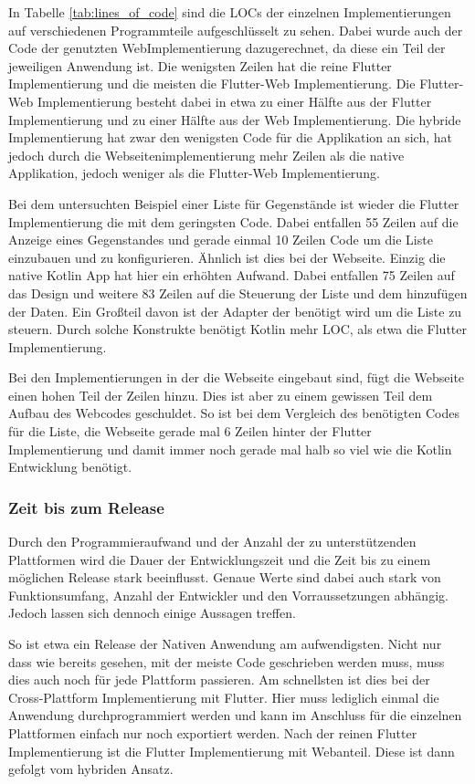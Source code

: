 In Tabelle \ref{tab:lines_of_code} sind die \ac{LOC}s der einzelnen Implementierungen auf verschiedenen Programmteile aufgeschlüsselt zu sehen. Dabei wurde auch der Code der genutzten WebImplementierung dazugerechnet, da diese ein Teil der jeweiligen Anwendung ist. Die wenigsten Zeilen hat die reine Flutter Implementierung und die meisten die Flutter-Web Implementierung.  Die Flutter-Web Implementierung besteht dabei in etwa zu einer Hälfte aus der Flutter Implementierung und zu einer Hälfte aus der Web Implementierung. Die hybride Implementierung hat zwar den wenigsten Code für die Applikation an sich, hat jedoch durch die Webseitenimplementierung mehr Zeilen als die native Applikation, jedoch weniger als die Flutter-Web Implementierung. 

Bei dem untersuchten Beispiel einer Liste für Gegenstände ist wieder die Flutter Implementierung die mit dem geringsten Code. Dabei entfallen 55 Zeilen auf die Anzeige eines Gegenstandes und gerade einmal 10 Zeilen Code um die Liste einzubauen und zu konfigurieren. Ähnlich ist dies bei der Webseite. Einzig die native Kotlin App hat hier ein erhöhten Aufwand. Dabei entfallen 75 Zeilen auf das Design und weitere 83 Zeilen auf die Steuerung der Liste und dem hinzufügen der Daten. Ein Großteil davon ist der Adapter der benötigt wird um die Liste zu steuern. Durch solche Konstrukte benötigt Kotlin mehr \ac{LOC}, als etwa die Flutter Implementierung.

Bei den Implementierungen in der die Webseite eingebaut sind, fügt die Webseite einen hohen Teil der Zeilen hinzu. Dies ist aber zu einem gewissen Teil dem Aufbau des Webcodes geschuldet. So ist bei dem Vergleich des benötigten Codes für die Liste, die Webseite gerade mal 6 Zeilen hinter der Flutter Implementierung und damit immer noch gerade mal halb so viel wie die Kotlin Entwicklung benötigt.

\subsubsection{Zeit bis zum Release}
Durch den Programmieraufwand und der Anzahl der zu unterstützenden Plattformen wird die Dauer der Entwicklungszeit und die Zeit bis zu einem möglichen Release stark beeinflusst. Genaue Werte sind dabei auch stark von Funktionsumfang, Anzahl der Entwickler und den Vorraussetzungen abhängig. Jedoch lassen sich dennoch einige Aussagen treffen.

So ist etwa ein Release der Nativen Anwendung am aufwendigsten. Nicht nur dass wie bereits gesehen, mit der meiste Code geschrieben werden muss, muss dies auch noch für jede Plattform passieren. Am schnellsten ist dies bei der Cross-Plattform Implementierung mit Flutter. Hier muss lediglich einmal die Anwendung durchprogrammiert werden und kann im Anschluss für die einzelnen Plattformen einfach nur noch exportiert werden. Nach der reinen Flutter Implementierung ist die Flutter Implementierung mit Webanteil. Diese ist dann gefolgt vom hybriden Ansatz. 

